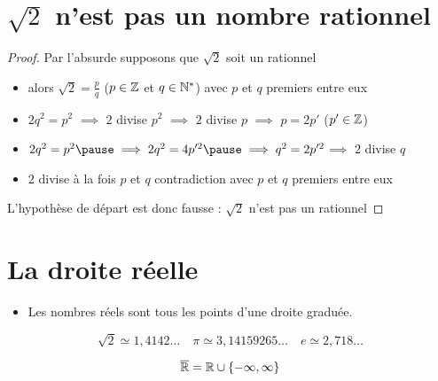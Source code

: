 \section*{$\sqrt2$ n'est pas un nombre rationnel}

\begin{frame}

\end{frame}


\begin{frame}
\begin{proposition}
\end{proposition}

\pause
\begin{proof}
\pause
Par l'absurde supposons que $\sqrt{2}$ soit un rationnel
\pause
\medskip
\begin{itemize}
\setlength{\itemsep}{5pt}
  \item alors  $\sqrt{2}=\frac pq$ ($p\in \mathbb{Z}$ et $q\in \mathbb{N}^*$) \pause avec $p$ et $q$ premiers entre eux
\pause
  \item $2q^2=p^2$ \pause $\implies$ $2$ divise $p^2$ \pause $\implies$ $2$ divise $p$ \pause$\implies$ $p=2p'$ ($p'\in \mathbb{Z}$)
 \pause
  \item $2q^2=p^2 \pause \implies 2q^2=4p'^2 \pause \implies q^2=2p'^2$\pause $\implies$ $2$ divise $q$
 \pause
  \item $2$ divise à la fois $p$ et $q$ \pause contradiction avec  $p$ et $q$ premiers entre eux
\end{itemize}
\pause
\medskip
L'hypothèse de départ est donc fausse :  
\pause $\sqrt2$ n'est pas un rationnel
\end{proof}

\end{frame}

\section*{La droite réelle}

\begin{frame}
\begin{itemize}
\item Les nombres réels sont tous les points d'une droite graduée.
\end{itemize}
\pause
$$\sqrt{2}\simeq 1,4142\ldots \quad 
\pi\simeq 3,14159265\ldots \quad e\simeq 2,718\ldots$$
\pause
\begin{mydefinition}
\[ \overline{\mathbb{R}}=\mathbb{R}\cup\{-\infty,\infty\}  \]
\end{mydefinition}
\end{frame}

